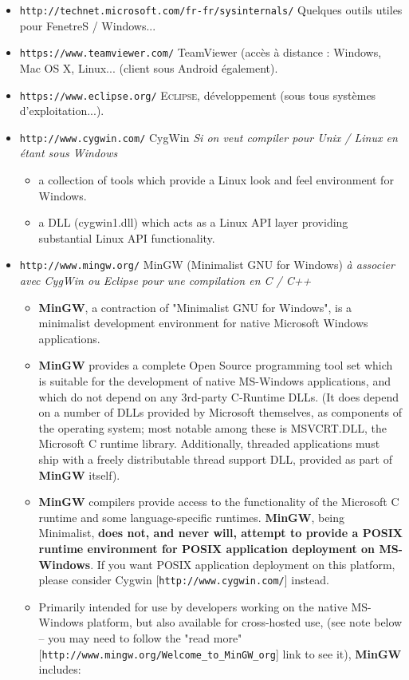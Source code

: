 \documentclass[11pt,twoside,a4paper]{article}
\begin{document}
\begin{itemize}
	\item[] \texttt{http://technet.microsoft.com/fr-fr/sysinternals/} Quelques outils utiles pour FenetreS / Windows...
	\item[] \texttt{https://www.teamviewer.com/} TeamViewer (acc{\`e}s {\`a} distance : Windows, Mac OS X, Linux... (client sous Android {\'e}galement). 
	\item[] \texttt{https://www.eclipse.org/} \textsc{Eclipse}, d{\'e}veloppement (sous tous syst{\`e}mes d'exploitation...). 
	\item[] \texttt{http://www.cygwin.com/} CygWin \emph{Si on veut compiler pour Unix / Linux en {\'e}tant sous Windows}
	\begin{itemize}
		\item a collection of tools which provide a Linux look and feel environment for Windows.
		\item a DLL (cygwin1.dll) which acts as a Linux API layer providing substantial Linux API functionality. 
	\end{itemize}
	\item[] \texttt{http://www.mingw.org/} MinGW (Minimalist GNU for Windows) \emph{{\`a} associer avec CygWin ou Eclipse pour une compilation en C / C++}
	\begin{itemize}
		\item \textbf{MinGW}, a contraction of "Minimalist GNU for Windows", is a minimalist development environment for native Microsoft Windows applications.
		\item \textbf{MinGW} provides a complete Open Source programming tool set which is suitable for the development of native MS-Windows applications, and which do not depend on any 3rd-party C-Runtime DLLs. (It does depend on a number of DLLs provided by Microsoft themselves, as components of the operating system; most notable among these is MSVCRT.DLL, the Microsoft C runtime library. Additionally, threaded applications must ship with a freely distributable thread support DLL, provided as part of \textbf{MinGW} itself).
		\item \textbf{MinGW} compilers provide access to the functionality of the Microsoft C runtime and some language-specific runtimes. \textbf{MinGW}, being Minimalist, \textbf{does not, and never will, attempt to provide a POSIX runtime environment for POSIX application deployment on MS-Windows}. If you want POSIX application deployment on this platform, please consider Cygwin [\texttt{http://www.cygwin.com/}] instead.
		\item Primarily intended for use by developers working on the native MS-Windows platform, but also available for cross-hosted use, (see note below -- you may need to follow the "read more" [\texttt{http://www.mingw.org/Welcome\_to\_MinGW\_org}] link to see it), \textbf{MinGW} includes:

\end{itemize}
\end{itemize}
\end{document}
